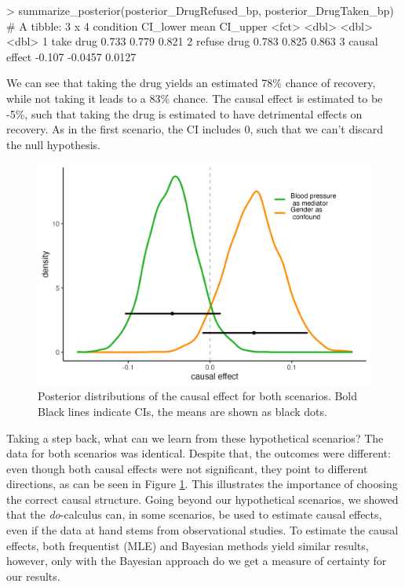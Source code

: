 \documentclass[nobib]{tufte-handout}
\newcommand{\docalc}{\emph{do}-calculus\xspace}
\begin{document}
\begin{minipage}[]{\textwidth}
\begin{rc}
> summarize_posterior(posterior_DrugRefused_bp, posterior_DrugTaken_bp)
# A tibble: 3 x 4
  condition     CI_lower    mean CI_upper
  <fct>            <dbl>   <dbl>    <dbl>
1 take drug        0.733  0.779    0.821 
2 refuse drug      0.783  0.825    0.863 
3 causal effect   -0.107 -0.0457   0.0127
\end{rc}
\end{minipage}

\vspace{-0.5cm}
We can see that taking the drug yields an estimated 78\% chance of recovery, while not taking it leads to a 83\% chance.
The causal effect is estimated to be -5\%, such that taking the drug is estimated to have detrimental effects on recovery.
As in the first scenario, the CI includes 0, such that we can't discard the null hypothesis.

\begin{figure}
    \centering
    \includegraphics[width=0.8\linewidth]{../img/posterior_causal_effect_smooth.png}
    \caption{Posterior distributions of the causal effect for both scenarios. Bold Black lines indicate CIs, the means are shown as black dots.}
    \label{fig:posteriors}
\end{figure}

Taking a step back, what can we learn from these hypothetical scenarios?
The data for both scenarios was identical.
Despite that, the outcomes were different: even though both causal effects were not significant, they point to different directions, as can be seen in Figure \ref{fig:posteriors}.
This illustrates the importance of choosing the correct causal structure. 
Going beyond our hypothetical scenarios, we showed that the \docalc can, in some scenarios, be used to estimate causal effects, even if the data at hand stems from observational studies.
To estimate the causal effects, both frequentist (MLE) and Bayesian methods yield similar results, however, only with the Bayesian approach do we get a measure of certainty for our results.

\printbibliography[heading=bibintoc]
\end{document}
